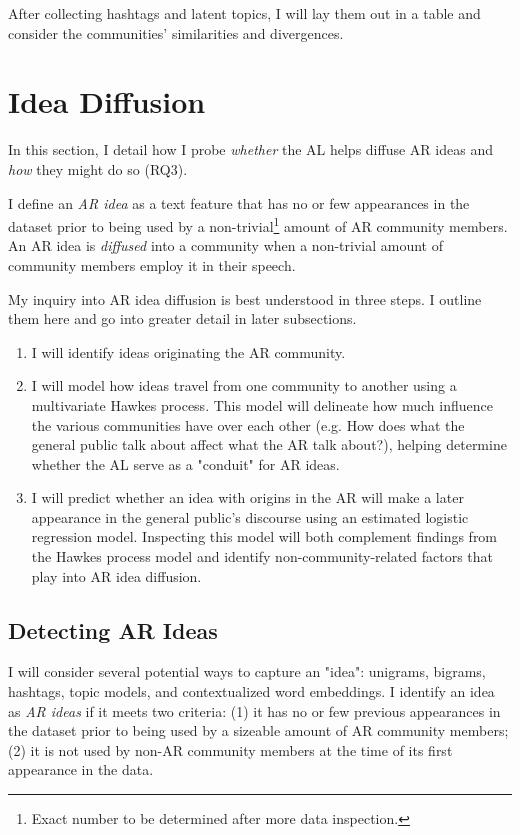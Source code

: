 \documentclass[acmlarge, screen, authorversion]{acmart}
\begin{document}
After collecting hashtags and latent topics, I will lay them out in a table and
consider the communities' similarities and divergences.

\section{Idea Diffusion}

In this section, I detail how I probe \textit{whether} the AL helps diffuse AR
ideas and \textit{how} they might do so (RQ3).

I define an \textit{AR idea} as a text feature that has no or few
appearances in the dataset prior to being used by a non-trivial\footnote{Exact
number to be determined after more data inspection.} amount of AR community
members. An AR idea is \textit{diffused} into a community when a non-trivial
amount of community members employ it in their speech.

My inquiry into AR idea diffusion is best understood in three steps. I 
outline them here and go into greater detail in later subsections.

\begin{enumerate} 	\item I will identify ideas originating the AR community.
	\item I will model how ideas travel from one community to another using a
multivariate Hawkes process. This model will delineate how much influence the
various communities have over each other (e.g. How does what the general public
talk about affect what the AR talk about?), helping determine whether the AL
serve as a "conduit" for AR ideas. 	
\item I will predict whether an idea with origins
in the AR will make a later appearance in the general public's discourse using
an estimated logistic regression model. Inspecting this model will both
complement findings from the Hawkes process model and identify
non-community-related factors that play into AR idea diffusion. \end{enumerate}

\subsection{Detecting AR Ideas}
I will consider several potential ways to capture an "idea": unigrams, bigrams, 
hashtags, topic models, and contextualized word embeddings. I identify an idea as
\textit{AR ideas} if it meets two criteria: (1) it has no or few previous 
appearances in the dataset prior to being used by a sizeable amount of AR 
community members; (2) it is not used by non-AR community members at the time of its first appearance in the data.
\end{document}
